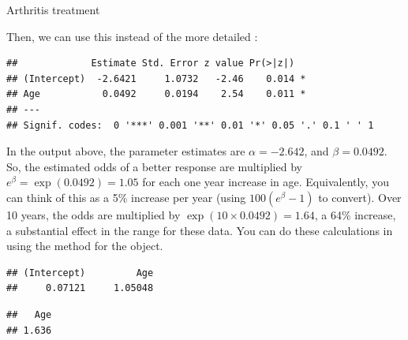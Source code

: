 \documentclass[11pt]{book}
\renewenvironment{knitrout}{\small\renewcommand{\baselinestretch}{.85}}{} %
\begin{document}
\begin{Example}[arthrit6]{Arthritis treatment}
\begin{knitrout}
\begin{kframe}
\begin{alltt}
 \hlkwb{<-} \hlstd{(}\hlstd{)}
  \hlstd{(}\hlopt{$}
\end{alltt}
\end{kframe}
\end{knitrout}
Then, we can use this instead of the more detailed :
\begin{knitrout}
\color{fgcolor}\begin{kframe}
\begin{alltt}
\end{alltt}
\begin{verbatim}
##             Estimate Std. Error z value Pr(>|z|)  
## (Intercept)  -2.6421     1.0732   -2.46    0.014 *
## Age           0.0492     0.0194    2.54    0.011 *
## ---
## Signif. codes:  0 '***' 0.001 '**' 0.01 '*' 0.05 '.' 0.1 ' ' 1
\end{verbatim}
\end{kframe}
\end{knitrout}


In the output above, the parameter estimates
are $\alpha = -2.642$, and $\beta = 0.0492$.  So, the estimated odds of
a better response are multiplied by $e^{\beta} = \exp(0.0492) = 1.05$
for each one year increase in age.  Equivalently, you can think of this
as a 5\% increase per year (using $100 (e^{\beta} -1)$ to convert).
Over 10 years, the odds are multiplied by $\exp(10 \times 0.0492) = 1.64$,
a 64\% increase, a substantial effect in the range for these data.
You can do these calculations in \R using the  method for the  object.
\begin{knitrout}
\color{fgcolor}\begin{kframe}
\begin{alltt}
\hlstd{(}
\end{alltt}
\begin{verbatim}
## (Intercept)         Age 
##     0.07121     1.05048
\end{verbatim}
\begin{alltt}
\hlstd{(}\hlopt{*}\hlstd{(arth.logistic)[}\hlstd{])}
\end{alltt}
\begin{verbatim}
##   Age 
## 1.636
\end{verbatim}
\end{kframe}
\end{knitrout}


\end{Example}
\end{document}
